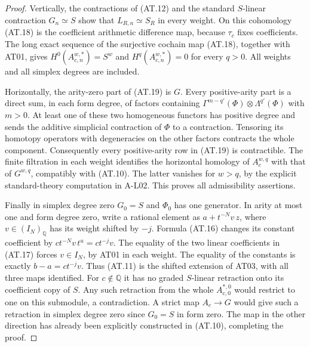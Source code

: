\begin{proof}
Vertically, the contractions of (AT.12) and the
standard $S$-linear contraction $G_n\simeq S$
show that $L_{R,n}\simeq S_R$ in every weight.
On this cohomology (AT.18) is the coefficient
arithmetic difference map, because $\tau_c$ fixes
coefficients. The long exact sequence of the
surjective cochain map (AT.18), together with AT01,
gives $H^0(A_{c,n}^{w,*})=S^w$ and
$H^q(A_{c,n}^{w,*})=0$ for every $q>0$.
All weights and all simplex degrees are included.

Horizontally, the arity-zero part of (AT.19) is $G$.
Every positive-arity part is a direct sum, in each
form degree, of factors containing
$\Gamma^{m-q'}(\Phi)\otimes\Lambda^{q'}(\Phi)$
with $m>0$. At least one of these two homogeneous
functors has positive degree and sends the additive
simplicial contraction of $\Phi$ to a contraction.
Tensoring its homotopy operators with degeneracies
on the other factors contracts the whole component.
Consequently every positive-arity row in (AT.19)
is contractible. The finite filtration in each
weight identifies the horizontal homology of
$A_c^{w,q}$ with that of $G^{w,q}$, compatibly with
(AT.10). The latter vanishes for $w>q$, by the
explicit standard-theory computation in A-L02.
This proves all admissibility assertions.

Finally in simplex degree zero $G_0=S$ and $\Phi_0$
has one generator. In arity at most one and form
degree zero, write a rational element as
$a+t^{-N}v\,z$, where $v\in(I_N)_{\mathbb Q}$
has its weight shifted by $-j$. Formula (AT.16)
changes its constant coefficient by
$c t^{-N}v\,t^u=c t^{-j}v$.
The equality of the two linear coefficients in
(AT.17) forces $v\in I_N$, by AT01 in each weight.
The equality of the constants is exactly
$b-a=c t^{-j}v$. Thus (AT.11) is the shifted
extension of AT03, with all three maps identified.
For $c\notin\mathbb Q$ it has no graded $S$-linear
retraction onto its coefficient copy of $S$.
Any such retraction from the whole $A_{c,0}^{*,0}$
would restrict to one on this submodule, a
contradiction. A strict map $A_c\to G$ would give
such a retraction in simplex degree zero since
$G_0=S$ in form zero. The map in the other direction
has already been explicitly constructed in (AT.10),
completing the proof.
\end{proof}
